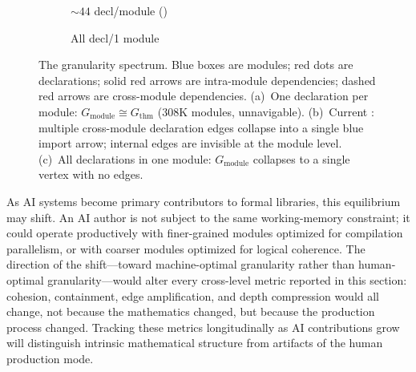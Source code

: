 \begin{figure}[ht]
\begin{subfigure}[b]{0.36\textwidth}
\caption{${\sim}44$ decl/module ()}
\label{fig:gran-current}
\end{subfigure}%
\hfill
\begin{subfigure}[b]{0.30\textwidth}
\centering
{}
\caption{All decl/1 module}
\label{fig:gran-coarse}
\end{subfigure}
\caption{The granularity spectrum. \textcolor{blue!60!black}{Blue boxes} are modules; \textcolor{red!70!black}{red dots} are declarations; \textcolor{red!70!black}{solid red arrows} are intra-module dependencies; \textcolor{red!70!black}{dashed red arrows} are cross-module dependencies. (a)~One declaration per module: $G_{\mathrm{module}} \cong G_{\mathrm{thm}}$ ($308$K modules, unnavigable). (b)~Current : multiple cross-module declaration edges collapse into a single \textcolor{blue!60!black}{blue import} arrow; internal edges are invisible at the module level. (c)~All declarations in one module: $G_{\mathrm{module}}$ collapses to a single vertex with no edges.}
\label{fig:granularity-spectrum}
\end{figure}

As AI systems become primary contributors to formal libraries, this equilibrium may shift. An AI author is not subject to the same working-memory constraint; it could operate productively with finer-grained modules optimized for compilation parallelism, or with coarser modules optimized for logical coherence. The direction of the shift---toward machine-optimal granularity rather than human-optimal granularity---would alter every cross-level metric reported in this section: cohesion, containment, edge amplification, and depth compression would all change, not because the mathematics changed, but because the production process changed. Tracking these metrics longitudinally as AI contributions grow will distinguish intrinsic mathematical structure from artifacts of the human production mode.

